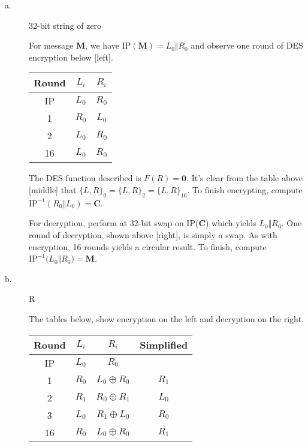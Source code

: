 \documentclass[../hw_sols.tex]{subfiles}
\begin{document}
\begin{description}

\item[a.] 32-bit string of zero

\begin{solution}
For message $\mathbf{M}$, we have IP$(\mathbf{M}) = L_0 \Vert R_0$ and observe one round of DES encryption below [left].

\begin{multicols}{3}
	\hfill   %
	

	\begin{center}
	\begin{tabular}{ c | c | c }
		\textbf{Round} & $L_i$ & $R_i$ \\[2pt]   %
		\hline
		IP & $L_0$ & $R_0$ \\[5pt]
		 1 & $R_0$ & $L_0$ \\[5pt]
		 2 & $L_0$ & $R_0$ \\[5pt]
		16 & $L_0$ & $R_0$ \\[5pt]
	\end{tabular}
	\end{center}

	
\end{multicols}

\vspace{-0.25cm}
The DES function described is $F(R) = \mathbf{0}$. It's clear from the table above [middle] that 
$\{L,R\}_0 = \{L,R\}_2 = \{L,R\}_{16}$. To finish encrypting, compute 
$\text{IP}^{-1}(R_0 \Vert L_0) = \mathbf{C}$.

For decryption, perform at 32-bit swap on IP($\mathbf{C}$) which yields $L_0 \Vert R_0$. One round of decryption, shown above [right], is simply a swap. As with encryption, 16 rounds yields a circular result. To finish, compute 
$\text{IP}^{-1}\big( L_0 \Vert R_0 \big) = \textbf{M}$.
\end{solution}


\item[b.] R

\begin{solution}
The tables below, show encryption on the left and decryption on the right.

\begin{multicols}{2}
\begin{center}
	\begin{tabular}{ c | c | c | c }
		\textbf{Round} & $L_i$ & $R_i$ & Simplified \\[2pt]   %
		\hline
		IP & $L_0$ & $R_0$ \\[5pt]
		 1 & $R_0$ & $L_0 \oplus R_0$ & $R_1$ \\[5pt]
		 2 & $R_1$ & $R_0 \oplus R_1$ & $L_0$ \\[5pt]
		 3 & $L_0$ & $R_1 \oplus L_0$ & $R_0$ \\[5pt]
		16 & $R_0$ & $L_0 \oplus R_0$ & $R_1$
	\end{tabular}
\end{center}


\end{multicols}
\end{solution}
\end{description}
\end{document}
